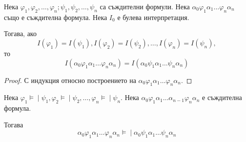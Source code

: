 \documentclass{article}
\newcommand{\mymod}{\models\!\mid}
\def\Proofs{1}
\begin{document}
\begin{thm}
Нека $\varphi_1, \varphi_2, \ldots, \varphi_n; \psi_1, \psi_2, \ldots, \psi_n$ са съждителни формули. Нека $\alpha_0\varphi_1\alpha_1\ldots\varphi_n\alpha_n$ също е съждителна формула. Нека $I_0$ е булева интерпретация.

Тогава, ако \[I(\varphi_1) = I(\psi_1), I(\varphi_2) = I(\psi_2), \ldots, I(\varphi_n) = I(\psi_n),\] то \[I(\alpha_0\varphi_1\alpha_1\ldots\varphi_n\alpha_n) = I(\alpha_0\psi_1\alpha_1\ldots\psi_n\alpha_n)\]


\ifcase\Proofs\or
\begin{proof}
С индукция относно построението на $\alpha_0\varphi_1\alpha_1\ldots\varphi_n\alpha_n$.
\end{proof}
\fi

\setcounter{conseq}{0}
\begin{conseq}
Нека $\varphi_1 \mymod \psi_1, \varphi_2 \mymod \psi_2, \ldots, \varphi_n \mymod \psi_n$. Нека $\alpha_0\varphi_1\alpha_1\ldots\alpha_{n-1}\varphi_n\alpha_n$ е съждителна формула. 

Тогава 
\[
\alpha_0\varphi_1\alpha_1\ldots\varphi_n\alpha_n \mymod \alpha_0\psi_1\alpha_1\ldots\psi_n\alpha_n
\]

\iffalse
\begin{proof}
$\\ \alpha_0\varphi_1\alpha_1\varphi_2\alpha_2\ldots\varphi_n\alpha_n$
$\\ \alpha_0\varphi_1'\alpha_1\varphi_2\alpha_2\ldots\varphi_n\alpha_n$ -- интерпретация на $\varphi_1$ с $I$;
$\\ \alpha_0\varphi_1'\alpha_1\varphi_2'\alpha_2\ldots\varphi_n\alpha_n$ -- интерпретация на $\varphi_2$ с $I$;
$\\ \ldots $
$\\ \alpha_0\varphi_1'\alpha_1\varphi_2'\alpha_2\ldots\varphi_n'\alpha_n$ -- интерпретация на $\varphi_n$ с $I$.

\begin{remark}
Белязаното участие на формула е или цялото дърво, или някакво поддърво на цялата формула.
\end{remark}

\begin{itemize}
\item $\neg\varphi$:
\begin{itemize}
\item $\varphi_1$;
\item $\neg\alpha_0'\varphi_1\alpha_1$.
\end{itemize}
\item $(\varphi_1 \sigma \psi_2)$:
\begin{itemize}
\item $\varphi_1$;
\item $(\alpha_0'\varphi_1\alpha_1'\sigma\psi_2), \alpha_1 = \alpha_1'\sigma\psi_2$;
\item $(\psi_1\sigma\alpha_0'\varphi_1\alpha_1'), \alpha_0 = \psi_1\sigma\alpha_0', \alpha_1 = \alpha_1'$.
\end{itemize}
\end{itemize}
\end{proof}
\fi


\end{conseq}
\end{thm}
\end{document}
